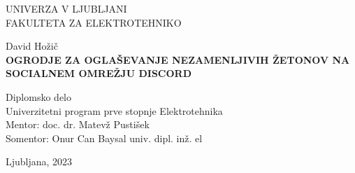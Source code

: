 \begin{titlepage}
    \thispagestyle{empty} 

        \begin{center}
        {\large 
        UNIVERZA V LJUBLJANI\\
        FAKULTETA ZA ELEKTROTEHNIKO\\
        }

        \vspace{3cm}
        {\LARGE David Hožič}\\

        \vspace{2cm}
        {\textbf{\LARGE 
        OGRODJE ZA OGLAŠEVANJE NEZAMENLJIVIH ŽETONOV
        NA SOCIALNEM OMREŽJU DISCORD\\ 
        }}

        \vspace{2cm}
        {\Large Diplomsko delo}\\
        
        \vspace{1cm}
        {\Large Univerzitetni program prve stopnje Elektrotehnika}\\

        \vspace{2cm}
        {\Large Mentor: doc. dr. Matevž Pustišek}\\
        {\Large Somentor: Onur Can Baysal univ. dipl. inž. el}

        \vfill
        {\Large Ljubljana, 2023}
        \end{center}
        \ \thispagestyle{empty}
\end{titlepage}
